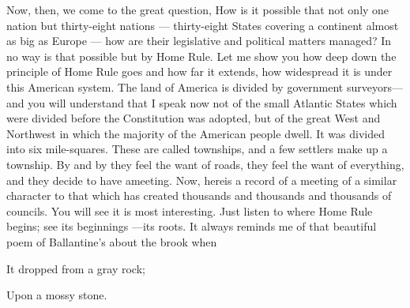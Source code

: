 \documentclass[11pt,openany]{book}
\begin{document}
Now, then, we come to the great question, How is it possible that not only one nation but thirty-eight nations --- thirty-eight States covering a continent almost as big as Europe --- how are their legislative and political matters managed? In no way is that possible but by Home Rule. Let me show you how deep down the principle of Home Rule goes and how far it extends, how widespread it is under this American system. The land of America is divided by government surveyors---and you will understand that I speak now not of the small Atlantic States which were divided before the Constitution was adopted, but of the great West and Northwest in which the majority of the American people dwell. It was divided into six mile-squares. These are called townships, and a few settlers make up a township. By and by they feel the want of roads, they feel the want of everything, and they decide to have ameeting. Now, hereis a record of a meeting of a similar character to that which has created thousands and thousands and thousands of councils. You will see it is most interesting. Just listen to where Home Rule begins; see its beginnings ---its roots. It always reminds me of that beautiful poem of Ballantine's about the brook when

It dropped from a gray rock;

Upon a mossy stone.
\end{document}
